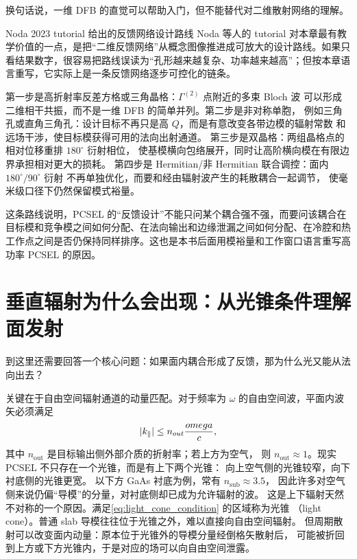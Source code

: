 换句话说，一维 DFB 的直觉可以帮助入门，但不能替代对二维散射网络的理解。

\begin{ApplicationBox}{Noda 2023 tutorial 给出的反馈网络设计路线}
Noda 等人的 tutorial 对本章最有教学价值的一点，是把“二维反馈网络”从概念图像推进成可放大的设计路线\cite{noda2023tutorial}。如果只看结果数字，很容易把路线误读为“孔形越来越复杂、功率越来越高”；但按本章语言重写，它实际上是一条反馈网络逐步可控化的链条。

第一步是高折射率反差方格或三角晶格：$\Gamma^{(2)}$ 点附近的多束 Bloch 波
可以形成二维相干共振，而不是一维 DFB 的简单并列。第二步是非对称单胞，
例如三角孔或直角三角孔：设计目标不再只是高 $Q$，而是有意改变各带边模的辐射常数
和远场干涉，使目标模获得可用的法向出射通道\cite{hirose2014}。
第三步是双晶格：两组晶格点的相对位移重排 $180^\circ$ 衍射相位，
使基模横向包络展开，同时让高阶横向模在有限边界承担相对更大的损耗\cite{yoshida2019}。
第四步是 Hermitian/非 Hermitian 联合调控：面内 $180^\circ/90^\circ$ 衍射
不再单独优化，而要和经由辐射波产生的耗散耦合一起调节，
使毫米级口径下仍然保留模式裕量\cite{yoshida2023,noda2023tutorial}。

这条路线说明，PCSEL 的“反馈设计”不能只问某个耦合强不强，而要问该耦合在目标模和竞争模之间如何分配、在法向输出和边缘泄漏之间如何分配、在冷腔和热工作点之间是否仍保持同样排序。这也是本书后面用模裕量和工作窗口语言重写高功率 PCSEL 的原因。
\end{ApplicationBox}

\section{垂直辐射为什么会出现：从光锥条件理解面发射}
到这里还需要回答一个核心问题：如果面内耦合形成了反馈，那为什么光又能从法向出去？

关键在于自由空间辐射通道的动量匹配。对于频率为 $\omega$ 的自由空间波，平面内波矢必须满足
\begin{equation}
|k_\parallel| \le n_{out}\frac{omega}{c},
\label{eq:light_cone_condition}
\end{equation}
其中 $n_{\mathrm{out}}$ 是目标输出侧外部介质的折射率；若上方为空气，
则 $n_{\mathrm{out}}\approx 1$。现实 PCSEL 不只存在一个光锥，而是有上下两个光锥：
向上空气侧的光锥较窄，向下衬底侧的光锥更宽。
以下方 GaAs 衬底为例，常有 $n_{\mathrm{sub}}\approx 3.5$，
因此许多对空气侧来说仍偏“导模”的分量，对衬底侧却已成为允许辐射的波。
这是上下辐射天然不对称的一个原因。满足\cref{eq:light_cone_condition} 的区域称为光锥
（light cone）。普通 slab 导模往往位于光锥之外，难以直接向自由空间辐射。
但周期散射可以改变面内动量：原本位于光锥外的导模分量经倒格矢散射后，
可能被折回到上方或下方光锥内，于是对应的场可以向自由空间泄露。

